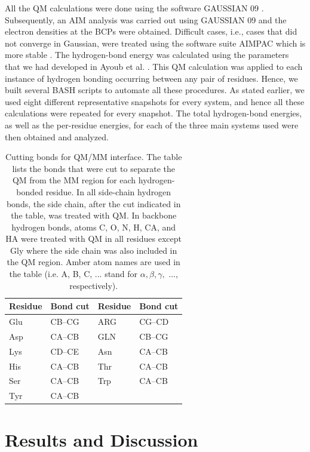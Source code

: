 \documentclass[11pt]{report}
\begin{document}
All the QM calculations were done using the software GAUSSIAN 09
\cite{g09}. Subsequently, an AIM analysis was carried out using GAUSSIAN 09 and the electron densities at the BCPs were obtained. Difficult cases, i.e., cases that did not converge in Gaussian, were treated using the software suite AIMPAC which is more stable
\cite{AIMPAC}.
The hydrogen-bond energy
was calculated using the parameters that we had developed in Ayoub et al.
\cite{Ayoub2014HB}. 
This QM calculation was applied to each instance of hydrogen bonding occurring between any pair of residues. Hence, we built several BASH scripts to automate all these procedures. As stated earlier, we used eight different representative snapshots for every system, and hence all these calculations were repeated for every snapshot. The total hydrogen-bond energies, as well as the per-residue energies, for each of the three main systems used were then obtained and analyzed.

\begin{table}
	\caption[Cutting bonds for QM/MM interface]{Cutting bonds for QM/MM interface. The table lists the bonds that were cut to separate the QM from
	the MM region for each hydrogen-bonded residue. In all side-chain hydrogen bonds, the side chain, after the cut indicated in the table, was treated with QM. In backbone hydrogen bonds, atoms C, O, N, H, CA, and HA were treated 
	with QM in all residues except Gly where the side chain was also included in the QM region. Amber atom names are used in the table (i.e. A, B, C, ... stand for $\alpha, \beta, \gamma,$ ..., respectively).}
	\label{t:THB-Cutting}
	\centering
	\begin{tabular*}{\linewidth}{@{\extracolsep{\fill}}llll}
		\toprule
		Residue & Bond cut & Residue & Bond cut\\
		\midrule
		Glu & CB--CG & ARG & CG--CD\\
		Asp & CA--CB & GLN & CB--CG\\
		Lys & CD--CE & Asn & CA--CB\\
		His & CA--CB & Thr & CA--CB\\
		Ser & CA--CB & Trp & CA--CB\\
		Tyr & CA--CB & &\\
		
		\bottomrule
	\end{tabular*} 
\end{table}


\section{Results and Discussion}
\label{s:THB-Results}
\end{document}

